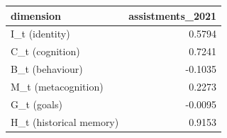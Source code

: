 \begin{tabular}{lr}
\toprule
dimension & assistments\_2021 \\
\midrule
I\_t (identity) & 0.5794 \\
C\_t (cognition) & 0.7241 \\
B\_t (behaviour) & -0.1035 \\
M\_t (metacognition) & 0.2273 \\
G\_t (goals) & -0.0095 \\
H\_t (historical memory) & 0.9153 \\
\bottomrule
\end{tabular}
